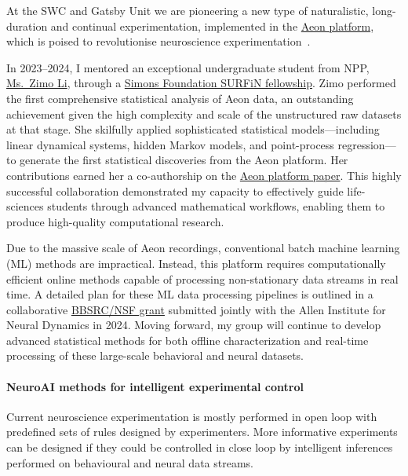 \documentclass{article}
\begin{document}
At the SWC and Gatsby Unit we are pioneering a new type of naturalistic, 
long-duration and continual experimentation, implemented in the 
\href{https://aeon.swc.ucl.ac.uk/}{Aeon platform}, which is poised to 
revolutionise neuroscience experimentation~\citep{campagnerEtAl25b}.

In 2023--2024, I mentored an exceptional undergraduate student from NPP,
\href{https://zimoli02.github.io/}{Ms.~Zimo Li}, through a
\href{https://www.simonsfoundation.org/2023/09/26/simons-foundation-announces-next-class-of-neuroscience-undergraduate-research-fellows/}{Simons Foundation
SURFiN fellowship}. Zimo performed the first comprehensive statistical analysis
of Aeon data, an outstanding achievement given the high complexity and scale of
the unstructured raw datasets at that stage. She skilfully applied
sophisticated statistical models---including linear dynamical systems,
hidden Markov models, and point-process regression---to generate the first
statistical discoveries from the Aeon platform. Her contributions earned her a
co-authorship on the
\href{https://www.biorxiv.org/content/10.1101/2025.07.31.664513v1}{Aeon
platform paper}. This highly successful
collaboration demonstrated my capacity to effectively guide life-sciences
students through advanced mathematical workflows, enabling them to produce
high-quality computational research.

Due to the massive scale of Aeon recordings, conventional batch machine
learning (ML) methods are impractical. Instead, this platform requires
computationally efficient online methods capable of processing non-stationary
data streams in real time. A detailed plan for these ML data processing
pipelines is outlined in a collaborative
\href{https://www.gatsby.ucl.ac.uk/~rapela/npp/submittedProposal.pdf}{BBSRC/NSF grant}
submitted jointly with the Allen Institute for Neural Dynamics in 2024. Moving
forward, my group will continue to develop advanced statistical methods for
both offline characterization and real-time processing of these large-scale
behavioral and neural datasets.

\paragraph{NeuroAI methods for intelligent experimental control}

Current neuroscience experimentation is mostly performed in open loop with
predefined sets of rules designed by experimenters. More informative
experiments can be designed if they could be controlled in close loop by
intelligent inferences performed on behavioural and neural data streams.
\end{document}
